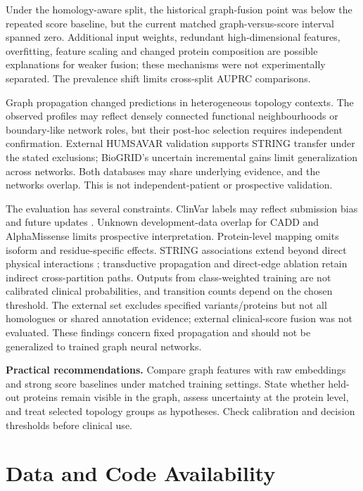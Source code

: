 \documentclass[conference]{IEEEtran}
\begin{document}
Under the homology-aware split, the historical graph-fusion point was below the repeated score baseline, but the current matched graph-versus-score interval spanned zero. Additional input weights, redundant high-dimensional features, overfitting, feature scaling and changed protein composition are possible explanations for weaker fusion; these mechanisms were not experimentally separated. The prevalence shift limits cross-split AUPRC comparisons.

Graph propagation changed predictions in heterogeneous topology contexts. The observed profiles may reflect densely connected functional neighbourhoods or boundary-like network roles, but their post-hoc selection requires independent confirmation. External HUMSAVAR validation supports STRING transfer under the stated exclusions; BioGRID's uncertain incremental gains limit generalization across networks. Both databases may share underlying evidence, and the networks overlap. This is not independent-patient or prospective validation.

The evaluation has several constraints. ClinVar labels may reflect submission bias and future updates \cite{Landrum2020ClinVar}. Unknown development-data overlap for CADD and AlphaMissense limits prospective interpretation. Protein-level mapping omits isoform and residue-specific effects. STRING associations extend beyond direct physical interactions \cite{Szklarczyk2023STRING}; transductive propagation and direct-edge ablation retain indirect cross-partition paths. Outputs from class-weighted training are not calibrated clinical probabilities, and transition counts depend on the chosen threshold. The external set excludes specified variants/proteins but not all homologues or shared annotation evidence; external clinical-score fusion was not evaluated. These findings concern fixed propagation and should not be generalized to trained graph neural networks.

\noindent\textbf{Practical recommendations.}
Compare graph features with raw embeddings and strong score baselines under matched training settings. State whether held-out proteins remain visible in the graph, assess uncertainty at the protein level, and treat selected topology groups as hypotheses. Check calibration and decision thresholds before clinical use.

\section*{Data and Code Availability}
\end{document}
